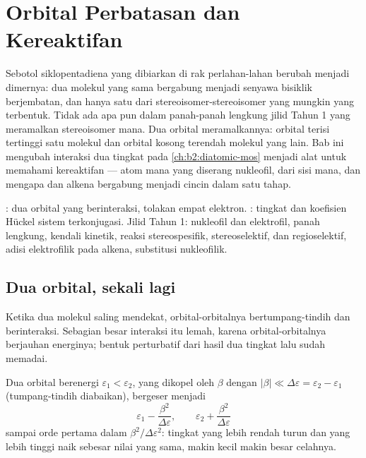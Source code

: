 \chapter{Orbital Perbatasan dan Kereaktifan}\label{ch:b2:frontier-orbitals}

Sebotol siklopentadiena yang dibiarkan di rak perlahan-lahan berubah
menjadi dimernya: dua molekul  yang sama bergabung menjadi senyawa
bisiklik berjembatan, dan hanya satu dari stereoisomer-stereoisomer yang
mungkin yang terbentuk. Tidak ada apa pun dalam panah-panah lengkung jilid
Tahun 1 yang meramalkan stereoisomer mana. Dua orbital meramalkannya:
orbital terisi tertinggi satu molekul dan orbital kosong terendah molekul
yang lain. Bab ini mengubah interaksi dua tingkat pada
\cref{ch:b2:diatomic-mos} menjadi alat untuk memahami kereaktifan --- atom
mana yang diserang nukleofil, dari sisi mana, dan mengapa  dan alkena
bergabung menjadi cincin dalam satu tahap.

\begin{recall}
: dua orbital yang berinteraksi, tolakan empat
elektron. : tingkat dan koefisien Hückel sistem
terkonjugasi. Jilid Tahun 1: nukleofil dan elektrofil, panah lengkung,
kendali kinetik, reaksi stereospesifik, stereoselektif, dan regioselektif,
adisi elektrofilik pada alkena, substitusi nukleofilik.
\end{recall}

\section{Dua orbital, sekali lagi}

Ketika dua molekul saling mendekat, orbital-orbitalnya bertumpang-tindih
dan berinteraksi. Sebagian besar interaksi itu lemah, karena
orbital-orbitalnya berjauhan energinya; bentuk perturbatif dari hasil dua
tingkat lalu sudah memadai.

\begin{theorem}\label{thm:b2:frontier-orbitals:perturbation}
Dua orbital berenergi $\varepsilon_1 < \varepsilon_2$, yang dikopel oleh  $\beta$ dengan $|\beta| \ll \Delta\varepsilon = \varepsilon_2 - \varepsilon_1$
(tumpang-tindih diabaikan), bergeser menjadi
\[
  \varepsilon_1 - \frac{\beta^2}{\Delta\varepsilon}, \qquad \varepsilon_2 + \frac{\beta^2}{\Delta\varepsilon}
\]
sampai orde pertama dalam $\beta^2/\Delta\varepsilon^2$: tingkat yang lebih
rendah turun dan yang lebih tinggi naik sebesar nilai yang sama, makin kecil
makin besar celahnya.
\end{theorem}

